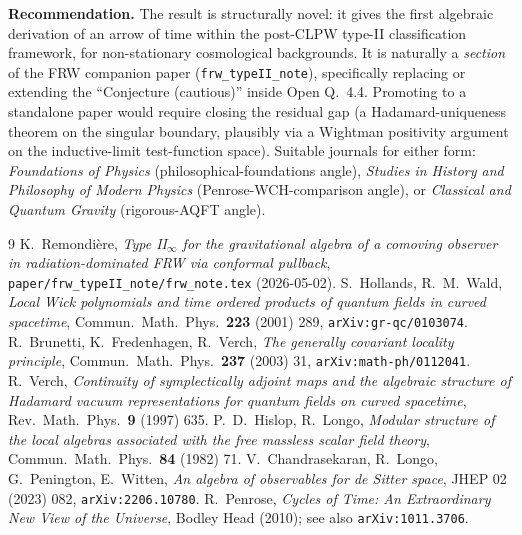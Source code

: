 \documentclass[11pt]{article}
\theoremstyle{definition}
\begin{document}
\textbf{Recommendation.} The result is structurally novel: it gives the
first algebraic derivation of an arrow of time within the post-CLPW
type-II classification framework, for non-stationary cosmological
backgrounds. It is naturally a \emph{section} of the FRW companion paper
(\texttt{frw\_typeII\_note}), specifically replacing or extending the
``Conjecture (cautious)'' inside Open Q.~4.4. Promoting to a standalone
paper would require closing the residual gap (a Hadamard-uniqueness
theorem on the singular boundary, plausibly via a Wightman positivity
argument on the inductive-limit test-function space). Suitable journals
for either form: \emph{Foundations of Physics} (philosophical-foundations
angle), \emph{Studies in History and Philosophy of Modern Physics}
(Penrose-WCH-comparison angle), or \emph{Classical and Quantum Gravity}
(rigorous-AQFT angle).


\begin{thebibliography}{9}
 K.~Remondi\`ere, \emph{Type II$_\infty$ for the
gravitational algebra of a comoving observer in radiation-dominated FRW
via conformal pullback}, \texttt{paper/frw\_typeII\_note/frw\_note.tex}
(2026-05-02).
 S.~Hollands, R.~M.~Wald, \emph{Local Wick
polynomials and time ordered products of quantum fields in curved
spacetime}, Commun.\ Math.\ Phys.\ \textbf{223} (2001) 289,
\texttt{arXiv:gr-qc/0103074}.
 R.~Brunetti, K.~Fredenhagen,
R.~Verch, \emph{The generally covariant locality principle}, Commun.\
Math.\ Phys.\ \textbf{237} (2003) 31, \texttt{arXiv:math-ph/0112041}.
\bibitem{Verch1997} R.~Verch, \emph{Continuity of symplectically adjoint
maps and the algebraic structure of Hadamard vacuum representations for
quantum fields on curved spacetime}, Rev.\ Math.\ Phys.\ \textbf{9}
(1997) 635.
 P.~D.~Hislop, R.~Longo, \emph{Modular structure
of the local algebras associated with the free massless scalar field
theory}, Commun.\ Math.\ Phys.\ \textbf{84} (1982) 71.
 V.~Chandrasekaran, R.~Longo, G.~Penington, E.~Witten,
\emph{An algebra of observables for de Sitter space}, JHEP 02 (2023)
082, \texttt{arXiv:2206.10780}.
 R.~Penrose, \emph{Cycles of Time: An Extraordinary
New View of the Universe}, Bodley Head (2010); see also
\texttt{arXiv:1011.3706}.
\end{thebibliography}
\end{document}
